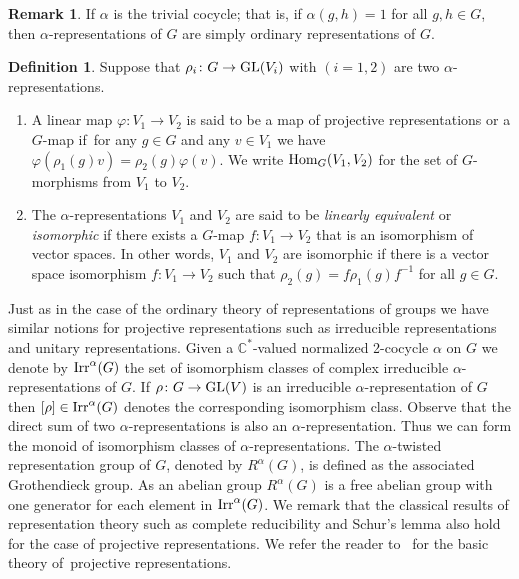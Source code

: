 \documentclass[pdftex]{sigma}
\def\C{\mathbb{C}}
\DeclareMathOperator{\Hom}{\textup{Hom}}
\DeclareMathOperator{\Irr}{\textup{Irr}}
\theoremstyle{definition}
\newtheorem{Def}[Th]{Definition}
\newtheorem{Rem}[Th]{Remark}
\numberwithin{equation}{section}
\begin{document}
\begin{Rem}
If $\alpha$ is the trivial cocycle; that is, if $\alpha(g,h)=1$ for all $g,h\in G$, then
$\alpha$-representations of $G$ are simply ordinary representations of $G$.
\end{Rem}

\begin{Def}
Suppose that $\rho_{i}\colon G\rightarrow {\rm GL}(V_{i})$ with $(i=1,2)$ are two $\alpha$-representations.
\begin{enumerate}\itemsep=0pt
\item A linear map $\varphi\colon V_{1}\to V_{2}$ is said to be a map of projective representations or a
$G$-map if~for any $g\in G$ and any $v\in V_{1}$ we have $\varphi(\rho_{1}(g)v)=\rho_{2}(g)\varphi(v)$.
We write $\Hom_{G}(V_{1},V_{2})$ for the set of $G$-morphisms from $V_{1}$ to $V_{2}$.

\item The $\alpha$-representations $V_{1}$ and $V_{2}$
are said to be \textit{linearly equivalent} or \textit{isomorphic} if
there exists a $G$-map $f\colon V_{1}\to V_{2}$ that is an isomorphism of vector spaces.
In other words, $V_{1}$ and $V_{2}$ are isomorphic if there is a vector space
isomorphism $f\colon V_{1}\rightarrow V_{2}$ such that $\rho_{2}(g)=f\rho_{1}(g)f^{-1}$ for all $g\in G$.
\end{enumerate}
\end{Def}

Just as in the case of the ordinary theory of representations of groups
we have similar notions for projective representations such as irreducible representations
and unitary representations. Given a $\C^{\ast}$-valued normalized 2-cocycle $\alpha$ on
$G$ we denote by $\Irr^{\alpha}(G)$ the set of isomorphism classes of
complex irreducible $\alpha$-representations of $G$.
If $\rho\colon G\to {\rm GL}(V)$ is an irreducible $\alpha$-representation of $G$ then $[\rho]\in \Irr^{\alpha}(G)$
denotes the corresponding isomorphism class. Observe that the direct sum of two $\alpha$-representations
is also an $\alpha$-representation. Thus we can form the monoid of isomorphism classes of $\alpha$-representations.
The $\alpha$-twisted representation group of $G$, denoted by $R^{\alpha}(G)$,
is defined as the associated Grothendieck group. As an abelian group $R^{\alpha}(G)$ is a free abelian
group with one generator for each element in $\Irr^{\alpha}(G)$.
We remark that the classical results of representation theory
such as complete reducibility and Schur's lemma also hold for the case of projective representations.
We refer the reader to~\cite{Karpilovsky2} for
the basic theory of~projective representations.
\end{document}
